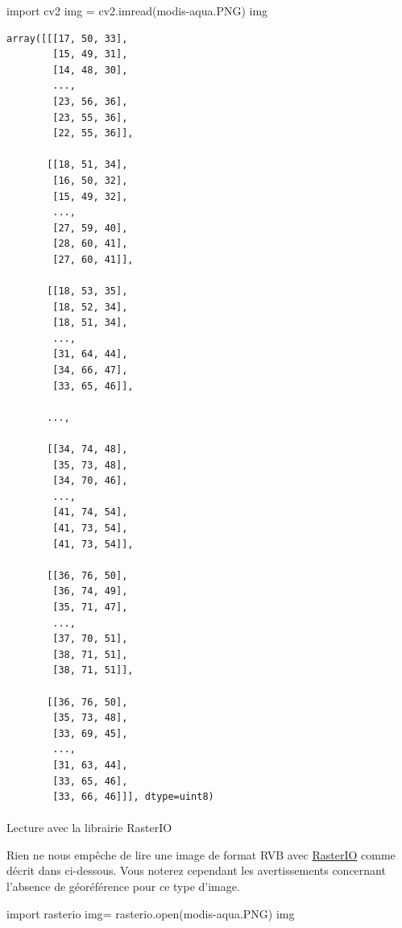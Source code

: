 \documentclass[
  11pt,
  letterpaper,
  open=any,
  twoside=false,
  french]{scrbook}
\makeatletter
\let\oldparagraph\paragraph
\renewcommand{\paragraph}{
    \@ifstar
      \xxxParagraphStar
      \xxxParagraphNoStar
  }
\newcommand{\xxxParagraphStar}[1]{\oldparagraph*{#1}\mbox{}}
\newcommand{\xxxParagraphNoStar}[1]{\oldparagraph{#1}\mbox{}}
\newenvironment{Shaded}{\begin{snugshade}}{\end{snugshade}}
\newcommand{\BuiltInTok}[1]{\textcolor[rgb]{0.00,0.23,0.31}{#1}}
\newcommand{\ImportTok}[1]{\textcolor[rgb]{0.00,0.46,0.62}{#1}}
\newcommand{\NormalTok}[1]{\textcolor[rgb]{0.00,0.23,0.31}{#1}}
\newcommand{\OperatorTok}[1]{\textcolor[rgb]{0.37,0.37,0.37}{#1}}
\newcommand{\StringTok}[1]{\textcolor[rgb]{0.13,0.47,0.30}{#1}}
\makeatother
\begin{document}
\begin{Shaded}
\begin{Highlighting}[]
\ImportTok{import}\NormalTok{ cv2}
\NormalTok{img }\OperatorTok{=}\NormalTok{ cv2.imread(}\StringTok{\textquotesingle{}modis{-}aqua.PNG\textquotesingle{}}\NormalTok{)}
\NormalTok{img}
\end{Highlighting}
\end{Shaded}

\begin{verbatim}
array([[[17, 50, 33],
        [15, 49, 31],
        [14, 48, 30],
        ...,
        [23, 56, 36],
        [23, 55, 36],
        [22, 55, 36]],

       [[18, 51, 34],
        [16, 50, 32],
        [15, 49, 32],
        ...,
        [27, 59, 40],
        [28, 60, 41],
        [27, 60, 41]],

       [[18, 53, 35],
        [18, 52, 34],
        [18, 51, 34],
        ...,
        [31, 64, 44],
        [34, 66, 47],
        [33, 65, 46]],

       ...,

       [[34, 74, 48],
        [35, 73, 48],
        [34, 70, 46],
        ...,
        [41, 74, 54],
        [41, 73, 54],
        [41, 73, 54]],

       [[36, 76, 50],
        [36, 74, 49],
        [35, 71, 47],
        ...,
        [37, 70, 51],
        [38, 71, 51],
        [38, 71, 51]],

       [[36, 76, 50],
        [35, 73, 48],
        [33, 69, 45],
        ...,
        [31, 63, 44],
        [33, 65, 46],
        [33, 66, 46]]], dtype=uint8)
\end{verbatim}

\paragraph{Lecture avec la librairie
RasterIO}\label{lecture-avec-la-librairie-rasterio}

Rien ne nous empêche de lire une image de format RVB avec
\href{https://rasterio.readthedocs.io/en/stable/}{RasterIO} comme décrit
dans ci-dessous. Vous noterez cependant les avertissements concernant
l'absence de géoréférence pour ce type d'image.

\begin{Shaded}
\begin{Highlighting}[]
\ImportTok{import}\NormalTok{ rasterio}
\NormalTok{img}\OperatorTok{=}\NormalTok{ rasterio.}\BuiltInTok{open}\NormalTok{(}\StringTok{\textquotesingle{}modis{-}aqua.PNG\textquotesingle{}}\NormalTok{)}
\NormalTok{img}
\end{Highlighting}
\end{Shaded}
\end{document}
